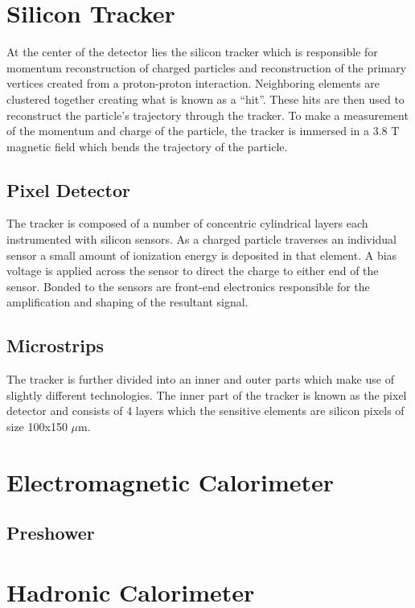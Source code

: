 \section{Silicon Tracker}

At the center of the detector lies the silicon tracker which is responsible for momentum reconstruction of charged particles and reconstruction of the primary vertices created from a proton-proton interaction. Neighboring elements are clustered together creating what is known as a ``hit''. These hits are then used to reconstruct the particle's trajectory through the tracker. To make a measurement of the momentum and charge of the particle, the tracker is immersed in a 3.8 T magnetic field which bends the trajectory of the particle.

\subsection{Pixel Detector}

The tracker is composed of a number of concentric cylindrical layers each instrumented with silicon sensors. As a charged particle traverses an individual sensor a small amount of ionization energy is deposited in that element. A bias voltage is applied across the sensor to direct the charge to either end of the sensor. Bonded to the sensors are front-end electronics responsible for the amplification and shaping of the resultant signal. 

\subsection{Microstrips}

The tracker is further divided into an inner and outer parts which make use of slightly different technologies. The inner part of the tracker is known as the pixel detector and consists of 4 layers which the sensitive elements are silicon pixels of size 100x150 $\mu$m.

\section{Electromagnetic Calorimeter}
\subsection{Preshower}
\section{Hadronic Calorimeter}
